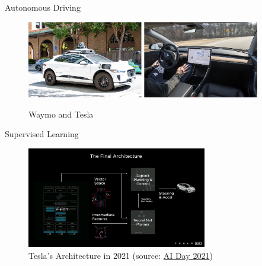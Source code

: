 \documentclass[8pt, aspectratio=169]{beamer} %
\begin{document}
\begin{frame}{\insertsubsectionhead}{Autonomous Driving}


  \vspace{0.5cm}

  {
    \begin{figure}
      \includegraphics[width=0.45\textwidth]{figures/waymo.pdf}
      \hspace{1cm}
      \includegraphics[width=0.45\textwidth]{figures/tesla.pdf}
      \caption{Waymo and Tesla}
    \end{figure}
  }

\end{frame}


\begin{frame}{\insertsubsectionhead}{Supervised Learning}

  \vspace{0.5cm}

  {
    \begin{figure}
      \includegraphics[width=0.7\textwidth]{figures/tesla-architecture.png}
      \caption{Tesla's Architecture in 2021 (source: \href{https://www.youtube.com/live/j0z4FweCy4M?si=vEB4egdqDOVpmpLu}{AI Day 2021})}
    \end{figure}
  }
\end{frame}
\end{document}
